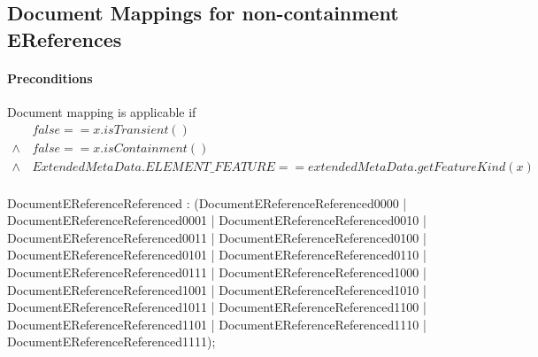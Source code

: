 \documentclass[11pt,a4paper]{article}
\begin{document}
\subsection{Document Mappings for non-containment EReferences}
\paragraph{Preconditions} 
Document mapping is applicable if
\begin{align*}
& \, false == x.isTransient()  \\
\wedge & \,  false == x.isContainment() \\
\wedge & \,  ExtendedMetaData.ELEMENT\_FEATURE == extendedMetaData.getFeatureKind(x) \\
\end{align*}


\begin{rail}
DocumentEReferenceReferenced : (DocumentEReferenceReferenced0000 | DocumentEReferenceReferenced0001 | DocumentEReferenceReferenced0010 | DocumentEReferenceReferenced0011 | DocumentEReferenceReferenced0100 | DocumentEReferenceReferenced0101 | DocumentEReferenceReferenced0110 | DocumentEReferenceReferenced0111 | DocumentEReferenceReferenced1000 | DocumentEReferenceReferenced1001 | DocumentEReferenceReferenced1010 | DocumentEReferenceReferenced1011 | DocumentEReferenceReferenced1100 | DocumentEReferenceReferenced1101 | DocumentEReferenceReferenced1110 | DocumentEReferenceReferenced1111);
\end{rail}
\end{document}
